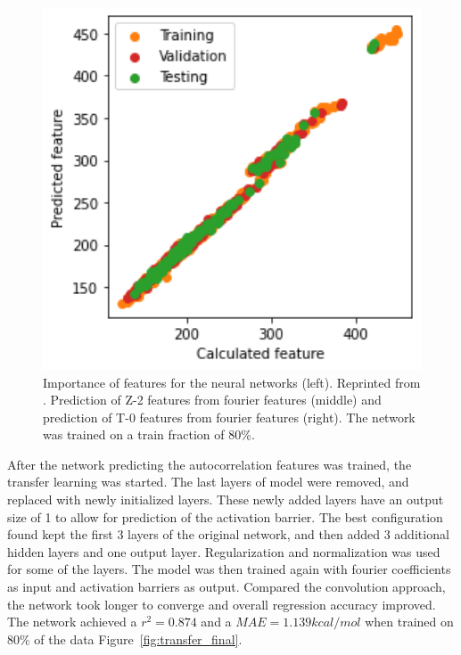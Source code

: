 \begin{figure}[h]
      \includegraphics[width=1.0\textwidth]{figures/regression/fourier/transfer/scatterT0.png}
    \endminipage
    \caption[Prediction of autocorrelation features from LEFD]{
    Importance of features for the neural networks (left). Reprinted from \cite{friederich_dos}.
    Prediction of Z-2 features from fourier features (middle) and prediction of T-0 features from fourier features (right). 
    The network was trained on a train fraction of 80\%.
    }
    \label{fig:transfer_result}
\end{figure}

After the network predicting the autocorrelation features was trained, the transfer learning was started.
The last layers of model were removed, and replaced with newly initialized layers.
These newly added layers have an output size of 1 to allow for prediction of the activation barrier.
The best configuration found kept the first 3 layers of the original network, and then added 3 additional hidden layers and one output layer.
Regularization and normalization was used for some of the layers.
The model was then trained again with fourier coefficients as input and activation barriers as output.
Compared the convolution approach, the network took longer to converge and overall regression accuracy improved.
The network achieved a $r^2=0.874$ and a $MAE=1.139 kcal/mol$ when trained on 80\% of the data Figure~\ref{fig:transfer_final}.

